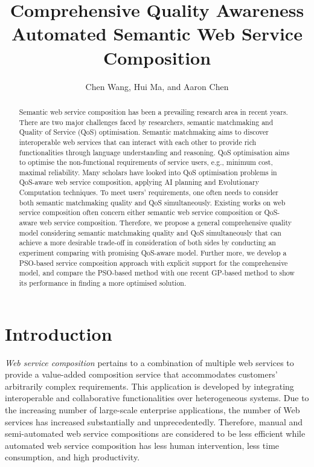 \documentclass{llncs}
\title{Comprehensive Quality Awareness Automated Semantic Web Service Composition}
\author{Chen Wang, Hui Ma, and Aaron Chen}
\institute{School of Engineering and Computer Science,
\\Victoria University of Wellington, New Zealand \\
Email: \{chen.wang, hui.ma, aaron.chen\}@ecs.vuw.ac.nz}
\begin{document}
\maketitle
\begin{abstract}
Semantic web service composition has been a prevailing research area in recent years. There are two major challenges faced by researchers, semantic matchmaking and Quality of Service (QoS) optimisation. Semantic matchmaking aims to discover interoperable web services that can interact with each other to provide rich functionalities through language understanding and reasoning. QoS optimisation aims to optimise the non-functional requirements of service users, e.g., minimum cost, maximal reliability. Many scholars have looked into QoS optimisation problems in QoS-aware web service composition, applying AI planning and Evolutionary Computation techniques. To meet users' requirements, one often needs to consider both semantic matchmaking quality and QoS simultaneously. Existing works on web service composition often concern either semantic web  service composition or QoS-aware web service composition. Therefore, we propose a general comprehensive quality model considering semantic matchmaking quality and QoS simultaneously that can achieve a more desirable trade-off in consideration of both sides by conducting an experiment comparing with promising QoS-aware model. Further more, we develop a PSO-based service composition approach with explicit support for the comprehensive model, and compare the PSO-based method with one recent GP-based method to show its performance in finding a more optimised solution.

\end{abstract}
\section{Introduction}\label{introduction}

\textit{Web service composition} pertains to a combination of multiple web services to provide a value-added composition service that accommodates customers' arbitrarily complex requirements. This application is developed by integrating interoperable and collaborative functionalities over heterogeneous systems. Due to the increasing number of large-scale enterprise applications, the number of Web services has increased substantially and unprecedentedly. Therefore, manual and semi-automated web service compositions are considered to be less efficient while automated web service composition has less human intervention, less time consumption, and high productivity.
\end{document}
